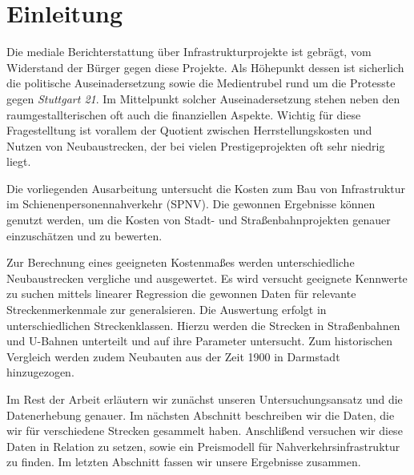 \section{Einleitung}


Die mediale Berichterstattung über Infrastrukturprojekte ist gebrägt, vom
Widerstand der Bürger gegen diese Projekte. Als Höhepunkt dessen ist sicherlich
die politische Auseinadersetzung sowie die Medientrubel rund um die Protesste
gegen \emph{Stuttgart 21}. Im Mittelpunkt solcher Auseinadersetzung stehen neben
den raumgestallterischen oft auch die finanziellen Aspekte. Wichtig für diese
Fragestelltung ist vorallem der Quotient zwischen Herrstellungskosten und
Nutzen von Neubaustrecken, der bei vielen Prestigeprojekten oft sehr niedrig
liegt.

Die vorliegenden Ausarbeitung untersucht die Kosten zum Bau von Infrastruktur im
Schienenpersonennahverkehr (SPNV). Die gewonnen Ergebnisse können genutzt
werden, um die Kosten von Stadt- und Straßenbahnprojekten genauer einzuschätzen
und zu bewerten.

Zur Berechnung eines geeigneten Kostenmaßes werden unterschiedliche
Neubaustrecken vergliche und ausgewertet. Es wird versucht geeignete Kennwerte
zu suchen mittels linearer Regression die gewonnen Daten für relevante
Streckenmerkenmale zur generalsieren. Die Auswertung erfolgt in
unterschiedlichen Streckenklassen. Hierzu werden die Strecken in Straßenbahnen
und U-Bahnen unterteilt und auf ihre Parameter untersucht. Zum historischen
Vergleich werden zudem Neubauten aus der Zeit 1900 in Darmstadt hinzugezogen.


Im Rest der Arbeit erläutern wir zunächst unseren Untersuchungsansatz und die
Datenerhebung genauer. Im nächsten Abschnitt beschreiben wir die Daten, die wir
für verschiedene Strecken gesammelt haben. Anschlißend versuchen wir diese Daten
in Relation zu setzen, sowie ein Preismodell für Nahverkehrsinfrastruktur zu
finden. Im letzten Abschnitt fassen wir unsere Ergebnisse zusammen.
